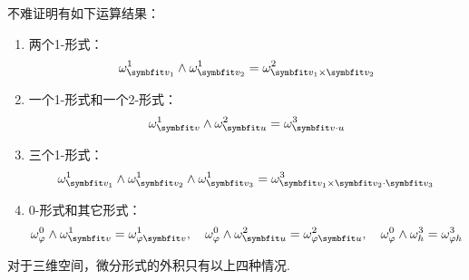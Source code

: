 不难证明有如下运算结果：
\begin{enumerate}[circ]
    \item 两个1-形式：
    \[\omega^1_{\vb{v}_1}\wedge\omega^1_{\vb{v}_2} = \omega^2_{\vb{v}_1\times\vb{v}_2}\]
    \item 一个1-形式和一个2-形式：
    \[\omega^1_{\vb{v}}\wedge\omega^2_{\vb{u}} = \omega^3_{\vb{v\cdot u}}\]
    \item 三个1-形式：
    \[\omega^1_{\vb{v}_1}\wedge\omega^1_{\vb{v}_2}\wedge\omega^1_{\vb{v}_3} = \omega^3_{\vb{v}_1 \times \vb{v}_2 \cdot \vb{v}_3}\]
    \item 0-形式和其它形式：
    \[\omega^0_\varphi\wedge\omega^1_{\vb{v}} = \omega^1_{\varphi\vb{v}},\quad \omega^0_\varphi\wedge\omega^2_{\vb{u}} = \omega^2_{\varphi\vb{u}},\quad\omega^0_\varphi\wedge\omega^3_h = \omega^3_{\varphi h}\]
\end{enumerate}
对于三维空间，微分形式的外积只有以上四种情况.


